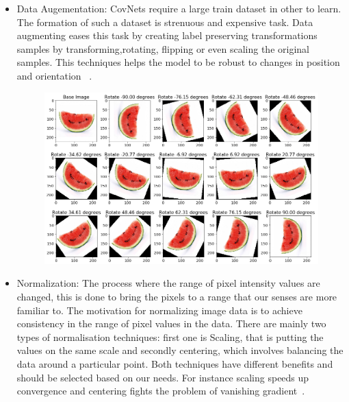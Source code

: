 \documentclass[12pt, a4paper,oneside]{report}
\begin{document}
\begin{itemize}
 	\item Data Augementation: CovNets require a large train dataset in other to learn. The formation of such a dataset is strenuous and expensive task. Data augmenting eases this task by creating label preserving transformations samples by transforming,rotating, flipping or even scaling the original samples. This techniques helps the model to be robust to changes in position and orientation ~\cite{taylor2017improving}. 
 	
 	\begin{figure}[!htb]
 		\includegraphics [scale=0.44] {augmentation.png}
 		\label{fig:augment}
 	\end{figure}
 
 \item Normalization: The process where the range of pixel intensity values are changed, this is done to bring the pixels to a range that our senses are more familiar to. The motivation for normalizing image data is to achieve consistency in the range of pixel values in the data. There are mainly two types of normalisation techniques: first one is Scaling, that is putting the values on the same scale and secondly centering, which involves balancing the data around a particular point. Both techniques have different benefits and should be selected based on our needs. For instance scaling speeds up convergence and centering fights the problem of vanishing gradient~\cite{normalizing}.

\end{itemize}
\end{document}
